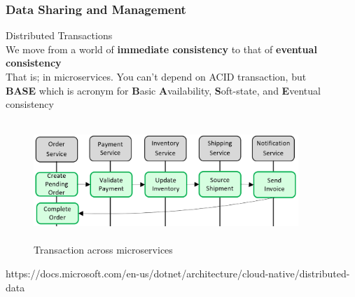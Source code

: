 \documentclass{beamer}
\begin{document}
	\begin{frame}
	\frametitle{Data Sharing and Management}
	Distributed Transactions \\
	\vspace{1mm}
	\hspace{3mm} \scriptsize {We move from a world of \textbf{immediate consistency} to that of \textbf{eventual consistency}}\\
	\hspace{3mm} \scriptsize {That is; in microservices. You can't depend on ACID transaction, but \\ 
		\hspace{3mm} \textbf{BASE} which is acronym for \textbf Basic \textbf Availability, \textbf Soft-state, and \textbf Eventual consistency}
	\vspace{1mm}
		\begin{figure}[h]
			\includegraphics[width=100mm,height= 45mm, scale=1]{img/saga-tr.png}
			\caption{Transaction across microservices}
		\end{figure}
		\tiny{https://docs.microsoft.com/en-us/dotnet/architecture/cloud-native/distributed-data}
	\vspace{100mm}
	\end{frame}
\end{document}

